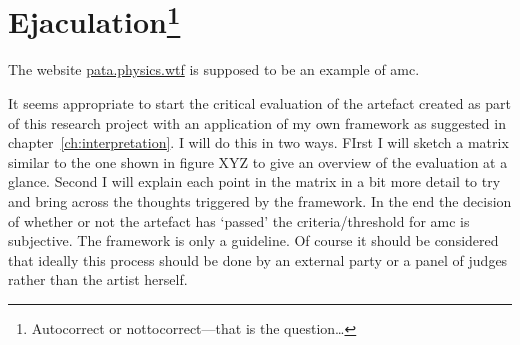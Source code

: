 

\section[Ejaculation]{Ejaculation\footnote{Autocorrect or nottocorrect---that is the question\ldots}}


The website \url{pata.physics.wtf} is supposed to be an example of \gls{amc}.

It seems appropriate to start the critical evaluation of the artefact created as part of this research project with an application of my own framework as suggested in chapter~\ref{ch:interpretation}. I will do this in two ways. FIrst I will sketch a matrix similar to the one shown in figure XYZ to give an overview of the evaluation at a glance. Second I will explain each point in the matrix in a bit more detail to try and bring across the thoughts triggered by the framework. In the end the decision of whether or not the artefact has `passed' the criteria/threshold for \gls{amc} is subjective. The framework is only a guideline. Of course it should be considered that ideally this process should be done by an external party or a panel of judges rather than the artist herself.

